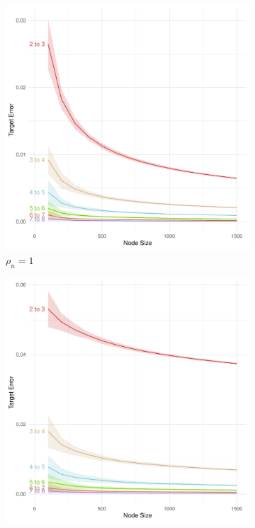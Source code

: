 \documentclass[10pt,journal,compsoc]{IEEEtran}
\numberwithin{equation}{section}
\begin{document}
\begin{figure}[htbp]
\begin{subfigure}{.49\columnwidth}
\includegraphics[width=\columnwidth]{MM_d_1.pdf}%
\caption{$\rho_n = 1$}
\end{subfigure}
\begin{subfigure}{.49\columnwidth}
\includegraphics[width=\columnwidth]{MM_13_1.pdf}%

\end{subfigure}
\end{figure}
\end{document}
